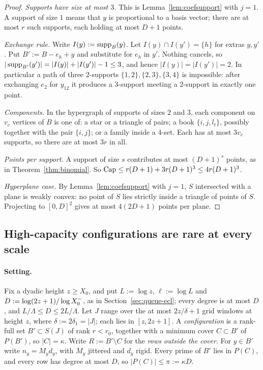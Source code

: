 \begin{proof}
\emph{Supports have size at most $3$.} This is Lemma~\ref{lem:coefsupport} with $j=1$. A support of size $1$ means that $y$ is
proportional to a basis vector; there are at most $r$ such supports, each holding at most $D+1$ points.

\emph{Exchange rule.} Write $I(y):=\operatorname{supp}_B(y)$. Let $I(y)\cap I(y')=\{h\}$ for extras $y,y'$. Put $B':=B-e_h+y$ and
substitute for $e_h$ in $y'$. Nothing cancels, so $|\operatorname{supp}_{B'}(y')|=|I(y)|+|I(y')|-1\le3$, and hence
$|I(y)|=|I(y')|=2$. In particular a path of three $2$-supports $\{1,2\},\{2,3\},\{3,4\}$ is impossible: after exchanging
$e_2$ for $y_{12}$ it produces a $3$-support meeting a $2$-support in exactly one point.

\emph{Components.} In the hypergraph of supports of sizes $2$ and $3$, each component on $v_c$ vertices of $B$ is one of:
a star or a triangle of pairs; a book $\{i,j,l_t\}$, possibly together with the pair $\{i,j\}$; or a family inside a $4$-set.
Each has at most $3v_c$ supports, so there are at most $3r$ in all.

\emph{Points per support.} A support of size $s$ contributes at most $(D+1)^s$ points, as in Theorem~\ref{thm:binomial}. So
$\operatorname{Cap}\le r(D+1)+3r(D+1)^3\le4r(D+1)^3$.

\emph{Hyperplane case.} By Lemma~\ref{lem:coefsupport} with $j=1$, $S$ intersected with a plane is weakly convex: no point of $S$
lies strictly inside a triangle of points of $S$. Projecting to $[0,D]^2$ gives at most $4(2D+1)$ points per plane.
\end{proof}

\subsection{High-capacity configurations are rare at every scale}\label{sec:queue-capl}

\paragraph{Setting.} Fix a dyadic height $z\ge X_0$, and put $L:=\log z$, $\ell:=\log L$ and $D:=\log(2z+1)/\log X_0^{-}$, as in
Section~\ref{sec:queue-ecl}; every degree is at most $D$, and $L/\Lambda\le D\le2L/\Lambda$.
Let $J$ range
over the at most $2z/\delta+1$ grid windows at height $z$, where $\delta:=2\delta_1=|J|$; each lies in $[z,2z+1]$. A \emph{configuration} is a rank-full set
$B'\subset S(J)$ of rank $r<r_0$, together with a minimum cover $C\subset B'$ of $P(B')$, so $|C|=\kappa$. Write $R:=B'\setminus
C$ for the \emph{rows outside the cover}. For $y\in B'$ write $n_y=M_yd_y$, with $M_y$ jittered and $d_y$ rigid. Every
prime of $B'$ lies in $P(C)$, and every row has degree at most $D$, so $|P(C)|\le\pi:=\kappa D$.

